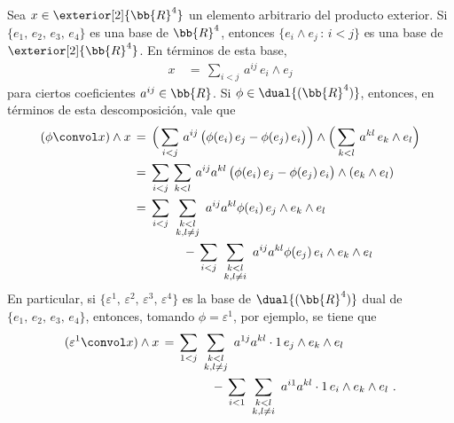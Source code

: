 Sea $x\in\exterior[2]{\bb{R}^{4}}$ un elemento arbitrario del producto
exterior. Si $\{e_{1},\,e_{2},\,e_{3},\,e_{4}\}$ es una base de
$\bb{R}^{4}$, entonces $\{e_{i}\wedge e_{j}\,:\,i<j\}$ es una base de
$\exterior[2]{\bb{R}^{4}}$. En t\'{e}rminos de esta base,
\begin{align*}
	x & \,=\,\sum_{i<j}\,a^{ij}\,e_{i}\wedge e_{j}
\end{align*}
%
para ciertos coeficientes $a^{ij}\in\bb{R}$. Si $\phi\in\dual{(\bb{R}^{4})}$,
entonces, en t\'{e}rminos de esta descomposici\'{o}n, vale que
\begin{align*}
	(\phi\convol x)\wedge x & \,=\,\Big(\sum_{i<j}\,a^{ij}\,
		\big(\phi(e_{i})\,e_{j}-\phi(e_{j})\,e_{i}\big)\Big)\wedge
		\Big(\sum_{k<l}\,a^{kl}\,e_{k}\wedge e_{l}\Big) \\
	& \,=\,\sum_{i<j}\,\sum_{k<l}\,a^{ij}a^{kl}\,
		\big(\phi(e_{i})\,e_{j}-\phi(e_{j})\,e_{i}\big)\wedge
			(e_{k}\wedge e_{l}) \\
	& \,=\,
	\sbox0{$\begin{smallmatrix} k<l \\k,l\not =j\end{smallmatrix}$}
		\sum_{i<j}\,\sum_{\usebox{0}}\,a^{ij}a^{kl}\phi(e_{i})\,
			e_{j}\wedge e_{k}\wedge e_{l} \\
	& \qquad\qquad \,-\,
	\sbox1{$\begin{smallmatrix} k<l \\k,l\not =i\end{smallmatrix}$}
		\sum_{i<j}\,\sum_{\usebox{1}}\,a^{ij}a^{kl}\phi(e_{j})\,
			e_{i}\wedge e_{k}\wedge e_{l}
\end{align*}
%
En particular, si $\{\varepsilon^{1},\,\varepsilon^{2},\,%
\varepsilon^{3},\,\varepsilon^{4}\}$ es la base de
$\dual{(\bb{R}^{4})}$ dual de $\{e_{1},\,e_{2},\,e_{3},\,e_{4}\}$,
entonces, tomando $\phi=\varepsilon^{1}$, por ejemplo, se tiene que
\begin{align*}
	(\varepsilon^{1}\convol x)\wedge x
	& \,=\,
	\sbox0{$\begin{smallmatrix} k<l \\k,l\not =j\end{smallmatrix}$}
		\sum_{1<j}\,\sum_{\usebox{0}}\,a^{1j}a^{kl}\cdot 1\,
			e_{j}\wedge e_{k}\wedge e_{l} \\
	& \qquad\qquad \,-\,
	\sbox1{$\begin{smallmatrix} k<l \\k,l\not =i\end{smallmatrix}$}
		\sum_{i<1}\,\sum_{\usebox{1}}\,a^{i1}a^{kl}\cdot 1\,
			e_{i}\wedge e_{k}\wedge e_{l}
	\text{ .}
\end{align*}
